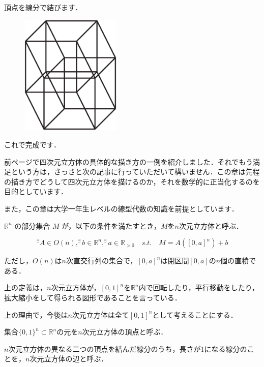 \documentclass[./main]{subfiles} %
\begin{document}

頂点を線分で結びます．

\begin{figure}[h]
\begin{center}
\includegraphics[width=48mm]{mask_rittai3.eps}
\end{center}
\end{figure}

これで完成です．


前ページで四次元立方体の具体的な描き方の一例を紹介しました．それでもう満足という方は，さっさと次の記事に行っていただいて構いません．この章は先程の描き方でどうして四次元立方体を描けるのか，それを数学的に正当化するのを目的としています．

また，この章は大学一年生レベルの線型代数の知識を前提としています．


$\mathbb{R}^n$ の部分集合 $M$ が，以下の条件を満たすとき，$M$を$n$次元立方体と呼ぶ．

\[
^\exists A \in O(n) , ^\exists b \in \mathbb{R}^n , ^\exists a \in \mathbb{R}_{>0} \quad s.t. \quad M = A ([0,a]^n) + b
\]

ただし，$O(n)$は$n$次直交行列の集合で，$[0,a]^n$は閉区間$[0,a]$の$n$個の直積である．

\rem

上の定義は，$n$次元立方体が，$[0,1]^n$を$\mathbb{R}^n$内で回転したり，平行移動をしたり，拡大縮小をして得られる図形であることを言っている．

\rem
上の理由で，今後は$n$次元立方体は全て$[0,1]^n$として考えることにする．


集合$\{0,1\} ^n \subset \mathbb{R}^n$の元を$n$次元立方体の{\gt 頂点}と呼ぶ．

$n$次元立方体の異なる二つの頂点を結んだ線分のうち，長さが$1$になる線分のことを，$n$次元立方体の{\gt 辺}と呼ぶ．
\end{document}
